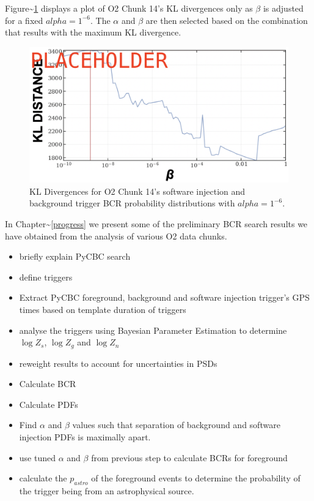\documentclass[%
 reprint,
 amsmath,amssymb,
 aps,
]{revtex4}
\begin{document}
Figure\textasciitilde\ref{fig:klDivLine} displays a plot of O2 Chunk 14's KL divergences only as
\(\beta\) is adjusted for a fixed \(alpha=1^{-6}\). The \(\alpha\) and \(\beta\) are then selected
based on the combination that results with the maximum KL divergence.



\begin{figure}[!h]

{\centering \includegraphics[width=0.75\linewidth]{images/kl_distance_14} 

}

\caption[KL Divergences for one BCR tunable parameter]{KL Divergences for O2 Chunk 14's software injection and background trigger BCR probability distributions with \(alpha=1^{-6}\).}\label{fig:klDivLine}
\end{figure}

In Chapter\textasciitilde\ref{progress} we present some of the preliminary BCR search results we
have obtained from the analysis of various O2 data chunks.






\begin{itemize}
	\item briefly explain PyCBC search
	\item define triggers
	\item Extract PyCBC foreground, background and software injection trigger's GPS times based on template duration of triggers
	\item analyse the triggers using Bayesian Parameter Estimation to determine $\log{Z_s}$, $\log{Z_g}$ and $\log{Z_n}$
	\item reweight results to account for uncertainties in PSDs
	\item Calculate BCR
	\item Calculate PDFs
	\item Find $\alpha$ and $\beta$ values such that separation of background and software injection PDFs is maximally apart.
	\item use tuned $\alpha$ and $\beta$ from previous step to calculate BCRs for foreground
	\item calculate the $p_{astro}$ of the foreground events to determine the probability of the trigger being from an astrophysical source. 
\end{itemize}
\end{document}
